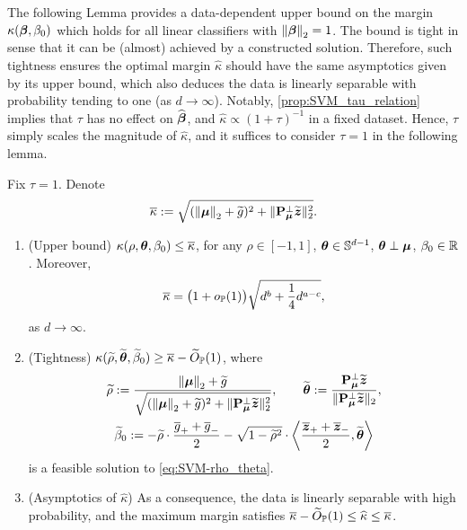 The following Lemma provides a data-dependent upper bound on the margin $\kappa(\vbeta, \beta_0)$ which holds for all linear classifiers with $\norm{\vbeta}_2 = 1$. The bound is tight in sense that it can be (almost) achieved by a constructed solution. Therefore, such tightness ensures the optimal margin $\hat\kappa$ should have the same asymptotics given by its upper bound, which also deduces the data is linearly separable with probability tending to one (as $d \to \infty$). 
Notably, \cref{prop:SVM_tau_relation} implies that $\tau$ has no effect on $\hat\vbeta$, and $\hat\kappa \propto (1 + \tau)^{-1}$ in a fixed dataset. Hence, $\tau$ simply scales the magnitude of $\hat\kappa$, and it suffices to consider $\tau = 1$ in the following lemma.
\begin{lem} \label{lem:upper_bound}
    Fix $\tau = 1$. Denote
\begin{equation} \label{eq:kappa_upper}
    \bar\kappa := \sqrt{ ( \norm{\vmu}_2 + \wt g )^2 + \| \bP_{\vmu}^\perp \wt\zz \|_2^2 }.
\end{equation}
    \begin{enumerate}[label=(\alph*)]
        \item 
        \label{lem:upper_bound_a}
        (Upper bound) $\kappa(\rho, \vtheta, \beta_0) \le \bar\kappa$, for any $\rho \in [-1, 1]$, $\vtheta \in \S^{d-1}$, $\vtheta \perp \vmu$, $\beta_0 \in \R$. Moreover,
        \begin{equation*}
            \bar\kappa = \bigl(1 + o_\P(1)\bigr) \sqrt{  d^{b} +  \frac{1}{4} d^{a-c} },
        \end{equation*}
        as $d \to \infty$.
        \item
        \label{lem:upper_bound_b}
        (Tightness) $\kappa(\wt\rho, \wt\vtheta, \wt\beta_0) \ge \bar\kappa - \wt O_{\P}(1)$, where
        \begin{equation} \label{eq:param_star}
            \begin{gathered}
                \wt\rho := \dfrac{ \norm{\vmu}_2 + \wt g }{\sqrt{ ( \norm{\vmu}_2 + \wt g )^2 + \| \bP_{\vmu}^\perp \wt\zz \|_2^2 } },
                \qquad
                \wt\vtheta := \frac{\bP_{\vmu}^\perp \wt\zz}{\| \bP_{\vmu}^\perp \wt\zz \|_2},
                \\
                \wt\beta_0 := - \wt\rho \cdot \frac{\bar g_+ + \bar g_-}{2} - \sqrt{1 - \wt\rho^2} \cdot \left\< \frac{\bar\zz_{+} + \bar\zz_{-}}{2}, \wt\vtheta \right\>
            \end{gathered}
        \end{equation}
        is a feasible solution to \cref{eq:SVM-rho_theta}.
        \item
        \label{lem:upper_bound_c}
        (Asymptotics of $\hat\kappa$) As a consequence, the data is linearly separable with high probability, and the maximum margin satisfies
        $\bar\kappa - \wt O_{\P}(1) \le \hat\kappa \le \bar\kappa$.
    \end{enumerate}
\end{lem}
